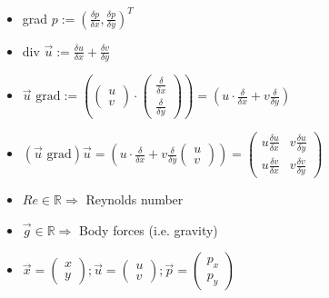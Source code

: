 \begin{itemize}
	\item grad $p := (\frac{\delta p}{\delta x},\frac{\delta p}{\delta y})^T$
	\item div $\vec{u} := \frac{\delta u}{\delta x} + \frac{\delta v}{\delta y}$
	\item $\vec{u} \text{ grad} := \left( \begin{pmatrix}
		u \\
		v
	\end{pmatrix}
	\cdot \begin{pmatrix}
		\frac{\delta}{\delta x} \\
		\frac{\delta}{\delta y}
	\end{pmatrix}\right)
	= (u \cdot \frac{\delta}{\delta x} + v \frac{\delta}{\delta y})$
	\item $(\vec{u} \text{ grad} ) \vec{u} = \left( u \cdot \frac{\delta}{\delta x} + v \frac{\delta}{\delta y}\begin{pmatrix}
		u \\
		v
	\end{pmatrix}\right) = \begin{pmatrix}
		u \frac{\delta u}{\delta x} & v \frac{\delta u}{\delta y}\\
		u \frac{\delta v}{\delta x} & v \frac{\delta v}{\delta y}
	\end{pmatrix}$
	\item $Re \in \mathds{R} \Rightarrow$ Reynolds number
	\item $\vec{g} \in \mathds{R} \Rightarrow$ Body forces (i.e. gravity)
	\item $\vec{x} = \begin{pmatrix}
	x\\
	y
	\end{pmatrix}; \vec{u} = \begin{pmatrix}
	u\\
	v
	\end{pmatrix}; \vec{p} = \begin{pmatrix}
	p_x \\
	p_y
	\end{pmatrix}$
\end{itemize}


